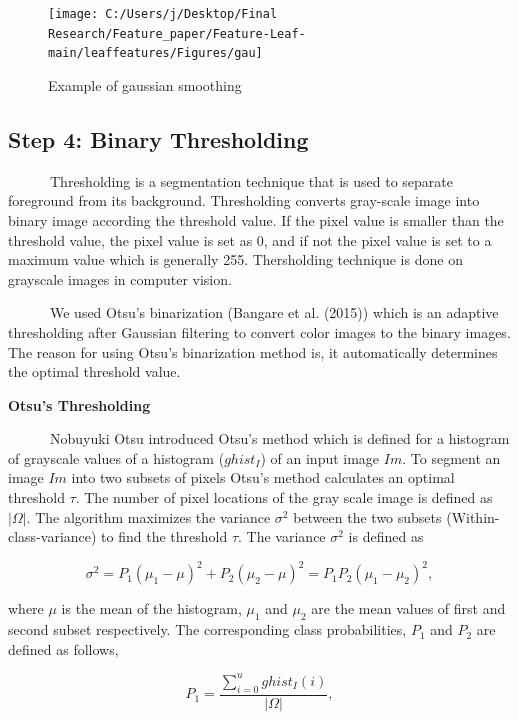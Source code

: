 \documentclass{article}
\begin{document}
\begin{figure}[!ht]

{\centering \texttt{[image: C:/Users/j/Desktop/Final Research/Feature\_paper/Feature-Leaf-main/leaffeatures/Figures/gau]} 

}

\caption{\label{fig:gau}Example of gaussian smoothing}\label{fig:unnamed-chunk-5}
\end{figure}

\hypertarget{step-4-binary-thresholding}{%
\subsection{Step 4: Binary
Thresholding}\label{step-4-binary-thresholding}}

~~~~~~Thresholding is a segmentation technique that is used to separate
foreground from its background. Thresholding converts gray-scale image
into binary image according the threshold value. If the pixel value is
smaller than the threshold value, the pixel value is set as 0, and if
not the pixel value is set to a maximum value which is generally 255.
Thersholding technique is done on grayscale images in computer vision.

~~~~~~We used Otsu's binarization (Bangare et al. (2015)) which is an
adaptive thresholding after Gaussian filtering to convert color images
to the binary images. The reason for using Otsu's binarization method
is, it automatically determines the optimal threshold value.

\textbf{Otsu's Thresholding}

~~~~~~Nobuyuki Otsu introduced Otsu's method which is defined for a
histogram of grayscale values of a histogram (\(ghist_I\)) of an input
image \(Im\). To segment an image \(Im\) into two subsets of pixels
Otsu's method calculates an optimal threshold \(\tau\). The number of
pixel locations of the gray scale image is defined as \(|\Omega|\). The
algorithm maximizes the variance \(\sigma^2\) between the two subsets
(Within-class-variance) to find the threshold \(\tau\). The variance
\(\sigma^2\) is defined as

\[\sigma^2 = P_1(\mu_1-\mu)^2 + P_2(\mu_2-\mu)^2 = P_1P_2(\mu_1-\mu_2)^2, \]

where \(\mu\) is the mean of the histogram, \(\mu_1\) and \(\mu_2\) are
the mean values of first and second subset respectively. The
corresponding class probabilities, \(P_1\) and \(P_2\) are defined as
follows,

\[P_1 = \frac{\sum_{i=0}^{u}ghist_I(i)}{|\Omega|},\]
\end{document}
